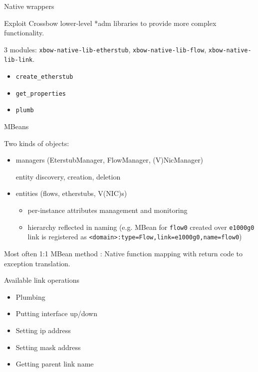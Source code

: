 \documentclass{beamer}
\begin{document}
		\begin{frame}{Native wrappers}

			Exploit Crossbow lower-level *adm libraries to provide more complex functionality.
			
			\medskip

			3 modules: \texttt{xbow-native-lib-etherstub}, \texttt{xbow-native-lib-flow}, \texttt{xbow-native-lib-link}.

			\begin{itemize}
				\item \texttt{create\_etherstub}
				\item \texttt{get\_properties}
				\item \texttt{plumb}
			\end{itemize}

		\end{frame}
	

		\begin{frame}{MBeans}

			Two kinds of objects:
			
			\begin{itemize}

				\item managers (EterstubManager, FlowManager, (V)NicManager)

					entity discovery, creation, deletion

				\item entities (flows, etherstubs, V(NIC)s)

					\begin{itemize}
						\item per-instance attributes management and monitoring
						\item hierarchy reflected in naming (e.g. MBean for \texttt{flow0}
						      created over \texttt{e1000g0} link is registered as \texttt{<domain>:type=Flow,link=e1000g0,name=flow0})
					\end{itemize}
			
			\end{itemize}

			Most often 1:1 MBean method : Native function mapping with return code to exception translation.

		\end{frame}

		\begin{frame}{Available link operations}

			\begin{itemize}
				\item Plumbing
				\item Putting interface up/down
				\item Setting ip address
				\item Setting mask address
				\item Getting parent link name				
			\end{itemize}
		\end{frame}
\end{document}
